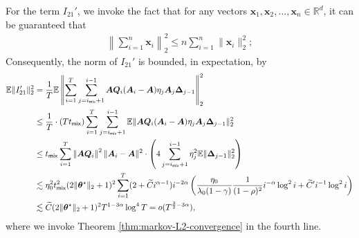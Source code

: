 For the term $I_{21}'$, we invoke the fact that for any vectors $\bm{x}_1,\bm{x}_2,...,\bm{x}_n \in \mathbb{R}^d$, it can be guaranteed that
\begin{align*}
\left\|\sum_{i=1}^n \bm{x}_i\right\|_2^2 \leq n \sum_{i=1}^n \|\bm{x}_i\|_2^2;
\end{align*}
Consequently, the norm of $I_{21}'$ is bounded, in expectation, by
\begin{align}\label{eq:markov-Berry-Esseen-I21}
\mathbb{E}\|I_{21}'\|_2^2 &= \frac{1}{T}  \mathbb{E}\left\|\sum_{i=1}^T \sum_{j=i_{\mathsf{mix}}+1}^{i-1}\bm{AQ}_i (\bm{A}_i - \bm{A}) \eta_j \bm{A}_j \bm{\Delta}_{j-1}\right\|_2^2 \nonumber \\ 
&\leq \frac{1}{T} \cdot (Tt_{\mathsf{mix}}) \sum_{i=1}^T \sum_{j=i_{\mathsf{mix}}+1}^{i-1} \mathbb{E}\|\bm{AQ}_i (\bm{A}_i - \bm{A}) \eta_j \bm{A}_j \bm{\Delta}_{j-1}\|_2^2 \nonumber 
\\ 
&\leq t_{\mathsf{mix}} \sum_{i=1}^T \left\|\bm{AQ}_i\right\|^2 \|\bm{A}_i - \bm{A}\|^2 \cdot \left(4  \sum_{j=i_{\mathsf{mix}}+1}^{i-1} \eta_j^2 \mathbb{E}\|\bm{\Delta}_{j-1}\|_2^2\right)\nonumber \\ 
&\lesssim \eta_0^2 t_{\mathsf{mix}}^2 (2\|\bm{\theta}^\star\|_2+1)^2 \sum_{i=1}^T (2+\widetilde{C}i^{\alpha-1})i^{-2\alpha} \left(\frac{\eta_0}{\lambda_0(1-\gamma)}\frac{1}{(1-\rho)^2}i^{-\alpha} \log^2 i + \widetilde{C}'i^{-1}\log^2 i\right)\nonumber \\ 
& \lesssim \widetilde{C}(2\|\bm{\theta}^\star\|_2+1)^2 T^{1-3\alpha} \log^4 T = o(T^{\frac{3}{2}-3\alpha}),
\end{align}
where we invoke Theorem \ref{thm:markov-L2-convergence} in the fourth line.


